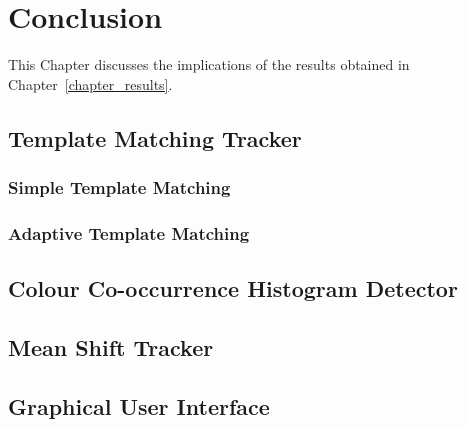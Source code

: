 \chapter{Conclusion}
This Chapter discusses the implications of the results obtained in
Chapter~\ref{chapter_results}. 

\section{Template Matching Tracker}



\subsection{Simple Template Matching}

\subsection{Adaptive Template Matching}


\section{Colour Co-occurrence Histogram Detector}


\section{Mean Shift Tracker}


\section{Graphical User Interface}

